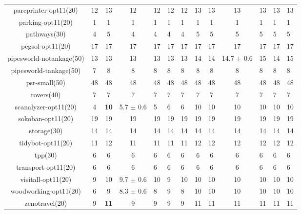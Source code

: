 \begin{center}
\begin{tabular}{|c|cccHHH|cccHHH|}
parcprinter-opt11(20) & 12 & 13 & 12 & 12 & 12 & 12 & 13 & 13 & 13 & 13 & 13 & 13\\
parking-opt11(20) & 1 & 1 & 1 & 1 & 1 & 1 & 1 & 1 & 1 & 1 & 1 & 1\\
pathways(30) & 4 & 5 & 4 & 4 & 4 & 4 & 5 & 5 & 5 & 5 & 5 & 5\\
pegsol-opt11(20) & 17 & 17 & 17 & 17 & 17 & 17 & 17 & 17 & 17 & 17 & 17 & 17\\
pipesworld-notankage(50) & 13 & 13 & 13 & 13 & 13 & 13 & 14 & 14 & 14.7 $\pm$ 0.6 & 15 & 14 & 15\\
pipesworld-tankage(50) & 7 & 8 & 8 & 8 & 8 & 8 & 8 & 8 & 8 & 8 & 8 & 8\\
psr-small(50) & 48 & 48 & 48 & 48 & 48 & 48 & 48 & 48 & 48 & 48 & 48 & 48\\
rovers(40) & 7 & 7 & 7 & 7 & 7 & 7 & 7 & 7 & 7 & 7 & 7 & 7\\
scanalyzer-opt11(20) & 4 & \textbf{10} & 5.7 $\pm$ 0.6 & 5 & 6 & 6 & 10 & 10 & 10 & 10 & 10 & 10\\
sokoban-opt11(20) & 19 & 19 & 19 & 19 & 19 & 19 & 19 & 19 & 19 & 19 & 19 & 19\\
storage(30) & 14 & 14 & 14 & 14 & 14 & 14 & 14 & 14 & 14 & 14 & 14 & 14\\
tidybot-opt11(20) & 11 & 12 & 11 & 11 & 11 & 11 & 12 & 12 & 12 & 12 & 12 & 12\\
tpp(30) & 6 & 6 & 6 & 6 & 6 & 6 & 6 & 6 & 6 & 6 & 6 & 6\\
transport-opt11(20) & 6 & 6 & 6 & 6 & 6 & 6 & 6 & 6 & 6 & 6 & 6 & 6\\
visitall-opt11(20) & 9 & 10 & 9.7 $\pm$ 0.6 & 10 & 9 & 10 & 10 & 10 & 10 & 10 & 10 & 10\\
woodworking-opt11(20) & 6 & 9 & 8.3 $\pm$ 0.6 & 8 & 9 & 8 & 10 & 10 & 10 & 10 & 10 & 10\\
zenotravel(20) & 9 & \textbf{11} & 9 & 9 & 9 & 9 & 11 & 11 & 11 & 11 & 11 & 11\\
\hline
\end{tabular}
\end{center}
